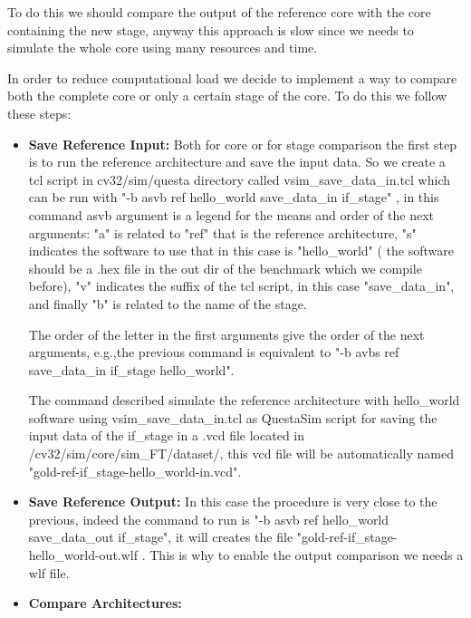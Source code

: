 {{{            To do this we should compare the output of the reference core with the core containing the new stage, anyway this approach is slow since we needs to simulate the whole core using many resources and time.
            
            In order to reduce computational load we decide to implement a way to compare both the complete core or only a certain stage of the core. To do this we follow these steps:
            \begin{itemize}
                \item \textbf{Save Reference Input:} Both for core or for stage comparison the first step is to run the reference architecture and save the input data. So we create a tcl script in cv32/sim/questa directory called vsim\_save\_data\_in.tcl which can be run with \line "-b asvb ref hello\_world save\_data\_in if\_stage" , in this command asvb argument is a legend for the means and order of the next arguments: "a" is related to "ref" that is the reference architecture, "s" indicates the software to use that in this case is "hello\_world" ( the software should be a .hex file in the out dir of the benchmark which we compile before),  "v" indicates the suffix of the tcl script, in this case "save\_data\_in", and finally "b" is related to the name of the stage. 
                
                The order of the letter in the first arguments give the order of the next arguments, e.g.,the previous command is equivalent to  \breakline "-b avbs ref save\_data\_in if\_stage hello\_world".
                
                The command described simulate the reference architecture with hello\_world software using vsim\_save\_data\_in.tcl as QuestaSim script for saving the input data of the if\_stage in a .vcd file located in \breakline /cv32/sim/core/sim\_FT/dataset/, this vcd file will be automatically named \breakline "gold-ref-if\_stage-hello\_world-in.vcd".
                
                \item \textbf{Save Reference Output:} In this case the procedure is very close to the previous, indeed the command to run is \breakline "-b asvb ref hello\_world save\_data\_out if\_stage", it will creates the file \breakline "gold-ref-if\_stage-hello\_world-out.wlf .
                This is why to enable the output comparison we needs a wlf file.
                
                \item \textbf{Compare Architectures:} 
                

\end{itemize}}}}
